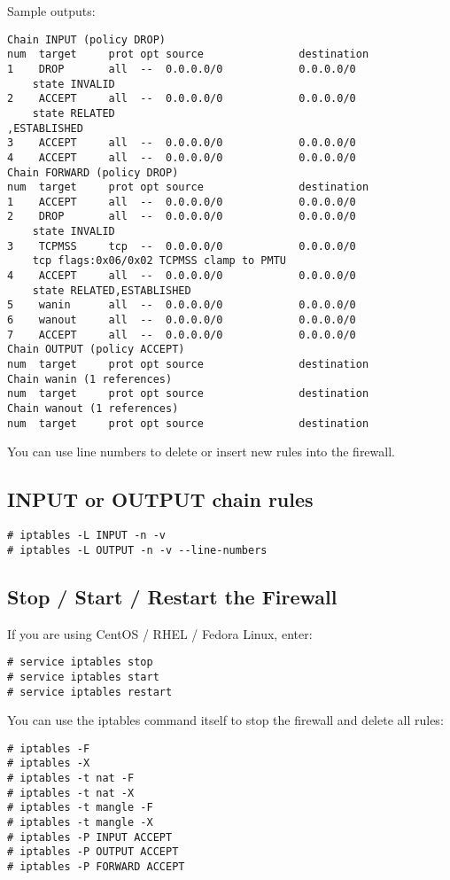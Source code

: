 Sample outputs:
\begin{verbatim}
Chain INPUT (policy DROP)
num  target     prot opt source               destination
1    DROP       all  --  0.0.0.0/0            0.0.0.0/0       
    state INVALID
2    ACCEPT     all  --  0.0.0.0/0            0.0.0.0/0       
    state RELATED
,ESTABLISHED
3    ACCEPT     all  --  0.0.0.0/0            0.0.0.0/0
4    ACCEPT     all  --  0.0.0.0/0            0.0.0.0/0
Chain FORWARD (policy DROP)
num  target     prot opt source               destination
1    ACCEPT     all  --  0.0.0.0/0            0.0.0.0/0
2    DROP       all  --  0.0.0.0/0            0.0.0.0/0       
    state INVALID
3    TCPMSS     tcp  --  0.0.0.0/0            0.0.0.0/0           
    tcp flags:0x06/0x02 TCPMSS clamp to PMTU
4    ACCEPT     all  --  0.0.0.0/0            0.0.0.0/0       
    state RELATED,ESTABLISHED
5    wanin      all  --  0.0.0.0/0            0.0.0.0/0
6    wanout     all  --  0.0.0.0/0            0.0.0.0/0
7    ACCEPT     all  --  0.0.0.0/0            0.0.0.0/0
Chain OUTPUT (policy ACCEPT)
num  target     prot opt source               destination
Chain wanin (1 references)
num  target     prot opt source               destination
Chain wanout (1 references)
num  target     prot opt source               destination
\end{verbatim}

You can use line numbers to delete or insert new rules into the firewall.

\subsection{INPUT or OUTPUT chain rules}
\begin{verbatim}
# iptables -L INPUT -n -v
# iptables -L OUTPUT -n -v --line-numbers
\end{verbatim}

\subsection{Stop / Start / Restart the Firewall}
If you are using CentOS / RHEL / Fedora Linux, enter:
\begin{verbatim}
# service iptables stop
# service iptables start
# service iptables restart
\end{verbatim}

You can use the iptables command itself to stop the firewall 
and delete all rules:
\begin{verbatim}
# iptables -F
# iptables -X
# iptables -t nat -F
# iptables -t nat -X
# iptables -t mangle -F
# iptables -t mangle -X
# iptables -P INPUT ACCEPT
# iptables -P OUTPUT ACCEPT
# iptables -P FORWARD ACCEPT
\end{verbatim}

